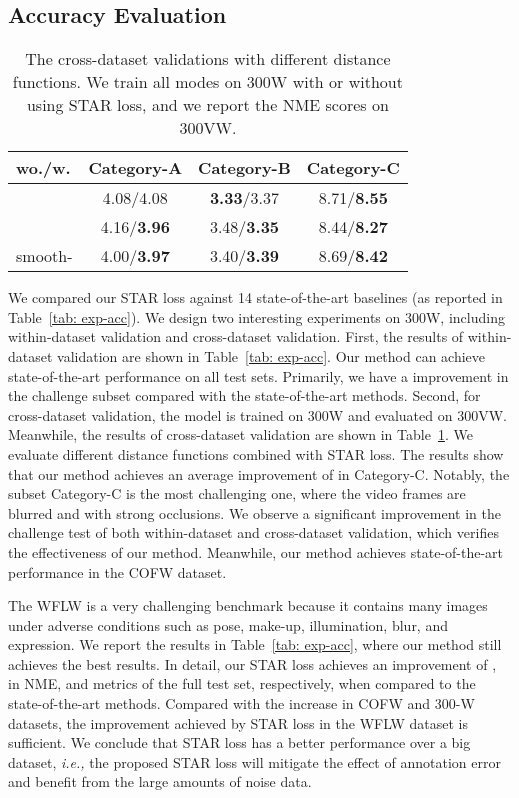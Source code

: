 \documentclass[10pt,twocolumn,letterpaper]{article}
\begin{document}
\subsection{Accuracy Evaluation}
\begin{table}[t]
\centering
\begin{tabular}{lccc}
\toprule
\multicolumn{1}{l|}{wo./w.}   & \multicolumn{1}{c}{Category-A} & \multicolumn{1}{c}{Category-B} & \multicolumn{1}{c}{Category-C}  \\
\midrule
\multicolumn{1}{l|}{} & {4.08/4.08} & {\textbf{3.33}/3.37} & {8.71/\textbf{8.55}} \\ 
\multicolumn{1}{l|}{} & {4.16/\textbf{3.96}} & {3.48/\textbf{3.35}} & {8.44/\textbf{8.27}} \\ 
\multicolumn{1}{l|}{smooth-} & {4.00/\textbf{3.97}} & {3.40/\textbf{3.39}} & {8.69/\textbf{8.42}} \\ 
\bottomrule
\end{tabular}\vspace{-0.5em}
\caption{
The cross-dataset validations with different distance functions.
We train all modes on 300W with or without using STAR loss, and we report the NME scores on 300VW.
}
\vspace{-1.0em}
\label{tab: 300VW}
\end{table}

We compared our STAR loss against 14 state-of-the-art baselines (as reported in Table~\ref{tab: exp-acc}).
We design two interesting experiments on 300W, including within-dataset validation and cross-dataset validation.
First, the results of within-dataset validation are shown in Table~\ref{tab: exp-acc}. Our method can achieve state-of-the-art performance on all test sets.
Primarily, we have a  improvement in the challenge subset compared with the state-of-the-art methods.
Second, for cross-dataset validation, the model is trained on 300W and evaluated on 300VW.
Meanwhile, the results of cross-dataset validation are shown in Table~\ref{tab: 300VW}.
We evaluate different distance functions combined with STAR loss.
The results show that our method achieves an average improvement of  in Category-C.
Notably, the subset Category-C is the most challenging one, where the video frames are blurred and with strong occlusions.
We observe a significant improvement in the challenge test of both within-dataset and cross-dataset validation, which verifies the effectiveness of our method.
Meanwhile, our method achieves state-of-the-art performance in the COFW dataset. 

The WFLW is a very challenging benchmark because it contains many images under adverse conditions such as pose, make-up, illumination, blur, and expression. We report the results in Table~\ref{tab: exp-acc}, where our method still achieves the best results. 
In detail, our STAR loss achieves an improvement of ,  in NME, and  metrics of the full test set, respectively, when compared to the state-of-the-art methods.
Compared with the increase in COFW and 300-W datasets, the improvement achieved by STAR loss in the WFLW dataset is sufficient. 
We conclude that STAR loss has a better performance over a big dataset, \emph{i.e.,} the proposed STAR loss will mitigate the effect of annotation error and benefit from the large amounts of noise data.
\end{document}
